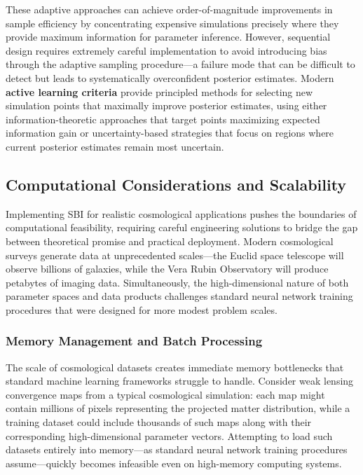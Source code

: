 \documentclass{SciPost}
\begin{document}
These adaptive approaches can achieve order-of-magnitude improvements in sample efficiency by concentrating expensive simulations precisely where they provide maximum information for parameter inference. However, sequential design requires extremely careful implementation to avoid introducing bias through the adaptive sampling procedure—a failure mode that can be difficult to detect but leads to systematically overconfident posterior estimates. Modern \textbf{active learning criteria} provide principled methods for selecting new simulation points that maximally improve posterior estimates, using either information-theoretic approaches that target points maximizing expected information gain or uncertainty-based strategies that focus on regions where current posterior estimates remain most uncertain.

\subsection{Computational Considerations and Scalability}

Implementing SBI for realistic cosmological applications pushes the boundaries of computational feasibility, requiring careful engineering solutions to bridge the gap between theoretical promise and practical deployment. Modern cosmological surveys generate data at unprecedented scales—the Euclid space telescope will observe billions of galaxies, while the Vera Rubin Observatory will produce petabytes of imaging data. Simultaneously, the high-dimensional nature of both parameter spaces and data products challenges standard neural network training procedures that were designed for more modest problem scales.

\subsubsection{Memory Management and Batch Processing}

The scale of cosmological datasets creates immediate memory bottlenecks that standard machine learning frameworks struggle to handle. Consider weak lensing convergence maps from a typical cosmological simulation: each map might contain millions of pixels representing the projected matter distribution, while a training dataset could include thousands of such maps along with their corresponding high-dimensional parameter vectors. Attempting to load such datasets entirely into memory—as standard neural network training procedures assume—quickly becomes infeasible even on high-memory computing systems.
\end{document}
